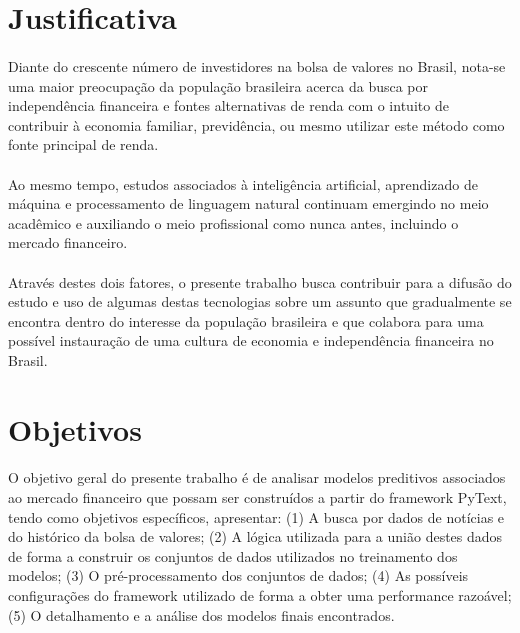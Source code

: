 \documentclass[grad,numbers]{coppe}
\begin{document}
		\section{Justificativa}
			\paragraph{}Diante do crescente número de investidores na bolsa de valores no Brasil, nota-se uma maior preocupação da população brasileira acerca da busca por independência financeira e fontes alternativas de renda com o intuito de contribuir à economia familiar, previdência, ou mesmo utilizar este método como fonte principal de renda\cite{bovespa-investors-growth}.
			\paragraph{}Ao mesmo tempo, estudos associados à inteligência artificial, aprendizado de máquina e processamento de linguagem natural continuam emergindo no meio acadêmico e auxiliando o meio profissional como nunca antes, incluindo o mercado financeiro\cite{ai-in-financial-growth}.
			\paragraph{}Através destes dois fatores, o presente trabalho busca contribuir para a difusão do estudo e uso de algumas destas tecnologias sobre um assunto que gradualmente se encontra dentro do interesse da população brasileira e que colabora para uma possível instauração de uma cultura de economia e independência financeira no Brasil.
		
		\section{Objetivos}
			\paragraph{}O objetivo geral do presente trabalho é de analisar modelos preditivos associados ao mercado financeiro que possam ser construídos a partir do framework PyText, tendo como objetivos específicos, apresentar: (1) A busca por dados de notícias e do histórico da bolsa de valores; (2) A lógica utilizada para a união destes dados de forma a construir os conjuntos de dados utilizados no treinamento dos modelos; (3) O pré-processamento dos conjuntos de dados; (4) As possíveis configurações do framework utilizado de forma a obter uma performance razoável; (5) O detalhamento e a análise dos modelos finais encontrados.
		
\end{document}

